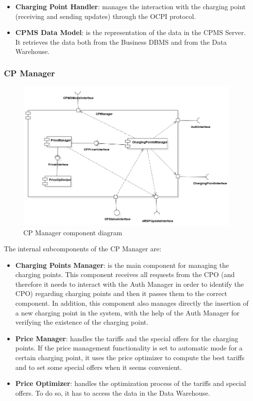 \documentclass{Configuration_Files/PoliMi3i_thesis}
\begin{document}
\begin{itemize}
    \item \textbf{Charging Point Handler}: manages the interaction with the charging point (receiving and sending updates) through the OCPI protocol.
    \item \textbf{CPMS Data Model}: is the representation of the data in the CPMS Server. It retrieves the data both from the Business DBMS and from the Data Warehouse.
\end{itemize}

\subsubsection{CP Manager}

\begin{figure}[H]
    \centering
    \includegraphics[width=1\textwidth]{Images/component/CPManager.jpg}
    \caption{CP Manager component diagram}
\end{figure}

The internal subcomponents of the CP Manager are:
\begin{itemize}
    \item \textbf{Charging Points Manager}: is the main component for managing the charging points. This component receives all requests from the CPO (and therefore it needs to interact with the Auth Manager in order to identify the CPO) regarding charging points and then it passes them to the correct component. In addition, this component also manages directly the insertion of a new charging point in the system, with the help of the Auth Manager for verifying the existence of the charging point.
    \item \textbf{Price Manager}: handles the tariffs and the special offers for the charging points. If the price management functionality is set to automatic mode for a certain charging point, it uses the price optimizer to compute the best tariffs and to set some special offers when it seems convenient.
    \item \textbf{Price Optimizer}: handles the optimization process of the tariffs and special offers. To do so, it has to access the data in the Data Warehouse.
\end{itemize}
\end{document}
